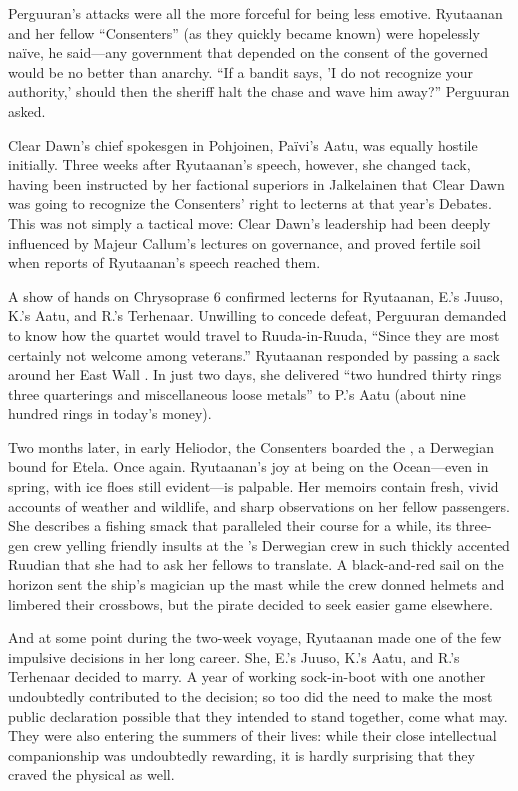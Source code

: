 \documentclass[12pt]{report}
\begin{document}
Perguuran's attacks were all the more forceful for being less emotive.
Ryutaanan and her fellow ``Consenters'' (as they quickly became known)
were hopelessly na\"ive, he said---any government that depended on the
consent of the governed would be no better than anarchy.  ``If a bandit
says, 'I do not recognize your authority,' should then the sheriff
halt the chase and wave him away?'' Perguuran asked.

Clear Dawn's chief spokesgen in Pohjoinen, Pa\"ivi's Aatu, was equally
hostile initially.  Three weeks after Ryutaanan's speech, however, she
changed tack, having been instructed by her factional superiors in
Jalkelainen that Clear Dawn was going to recognize the Consenters'
right to lecterns at that year's Debates.  This was not simply a
tactical move: Clear Dawn's leadership had been deeply influenced by
Majeur Callum's lectures on governance, and proved fertile soil when
reports of Ryutaanan's speech reached them.

A show of hands on Chrysoprase 6 confirmed lecterns for Ryutaanan,
E.'s Juuso, K.'s Aatu, and R.'s Terhenaar.  Unwilling to concede
defeat, Perguuran demanded to know how the quartet would travel to
Ruuda-in-Ruuda, ``Since they are most certainly not welcome among
veterans.''  Ryutaanan responded by passing a sack around her East Wall
.  In just two days, she delivered ``two hundred thirty
rings three quarterings and miscellaneous loose metals'' to P.'s Aatu
(about nine hundred rings in today's money).

Two months later, in early Heliodor, the Consenters boarded the
, a Derwegian  bound for Etela.
Once again. Ryutaanan's joy at being on the Ocean---even in spring,
with ice floes still evident---is palpable.  Her memoirs contain
fresh, vivid accounts of weather and wildlife, and sharp observations
on her fellow passengers.  She describes a fishing smack that
paralleled their course for a while, its three-gen crew yelling
friendly insults at the 's Derwegian crew in such thickly
accented Ruudian that she had to ask her fellows to translate.  A
black-and-red sail on the horizon sent the ship's magician up the mast
while the crew donned helmets and limbered their crossbows, but the
pirate decided to seek easier game elsewhere.

And at some point during the two-week voyage, Ryutaanan made one of
the few impulsive decisions in her long career.  She, E.'s Juuso, K.'s
Aatu, and R.'s Terhenaar decided to marry.  A year of working
sock-in-boot with one another undoubtedly contributed to the decision;
so too did the need to make the most public declaration possible that
they intended to stand together, come what may.  They were also
entering the summers of their lives: while their close intellectual
companionship was undoubtedly rewarding, it is hardly surprising that
they craved the physical as well.
\end{document}
